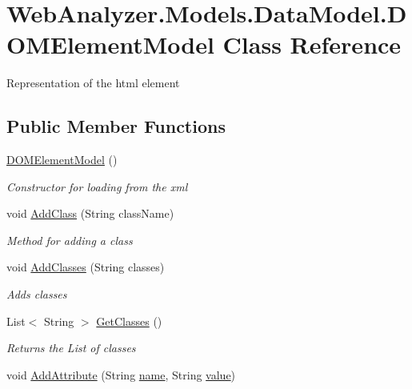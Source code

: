 \hypertarget{class_web_analyzer_1_1_models_1_1_data_model_1_1_d_o_m_element_model}{}\section{Web\+Analyzer.\+Models.\+Data\+Model.\+D\+O\+M\+Element\+Model Class Reference}
\label{class_web_analyzer_1_1_models_1_1_data_model_1_1_d_o_m_element_model}


Representation of the html element  


\subsection*{Public Member Functions}
\begin{DoxyCompactItemize}
\item 
\hyperlink{class_web_analyzer_1_1_models_1_1_data_model_1_1_d_o_m_element_model_ab48617b264142c24cea4d7bb461961e6}{D\+O\+M\+Element\+Model} ()
\begin{DoxyCompactList}\small\item\em Constructor for loading from the xml \end{DoxyCompactList}\item 
void \hyperlink{class_web_analyzer_1_1_models_1_1_data_model_1_1_d_o_m_element_model_ae0a8230577329fb64c25b3a9b22a0967}{Add\+Class} (String class\+Name)
\begin{DoxyCompactList}\small\item\em Method for adding a class \end{DoxyCompactList}\item 
void \hyperlink{class_web_analyzer_1_1_models_1_1_data_model_1_1_d_o_m_element_model_aad9bb498768e58e7baf0d38d8f9fddf8}{Add\+Classes} (String classes)
\begin{DoxyCompactList}\small\item\em Adds classes \end{DoxyCompactList}\item 
List$<$ String $>$ \hyperlink{class_web_analyzer_1_1_models_1_1_data_model_1_1_d_o_m_element_model_a21691fa37ebac85603f666e75b179c13}{Get\+Classes} ()
\begin{DoxyCompactList}\small\item\em Returns the List of classes \end{DoxyCompactList}\item 
void \hyperlink{class_web_analyzer_1_1_models_1_1_data_model_1_1_d_o_m_element_model_a23a4fd979c26240cdc178518b372bbf9}{Add\+Attribute} (String \hyperlink{_u_i_2_h_t_m_l_resources_2js_2src_2create__experiment_8js_adac2bcb4f01b574cbc63fe8ee2c56bf0}{name}, String \hyperlink{_u_i_2_h_t_m_l_resources_2js_2lib_2underscore_8min_8js_af7e1471ab89699458c4df8bb657298f6}{value})

\end{DoxyCompactItemize}
